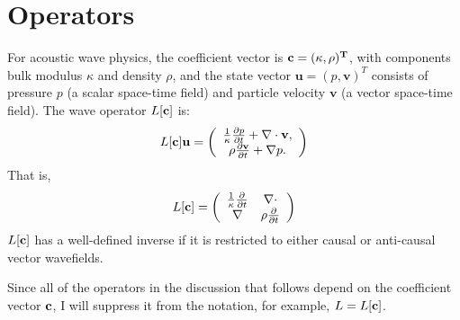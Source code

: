 \documentclass[georeport,12pt]{geophysics}
\newcommand{\bv}{\mathbf{v}}
\newcommand{\bu}{\mathbf{u}}
\begin{document}




\section{Operators}

For acoustic wave physics, the coefficient vector is
$\bf{c}=(\kappa,\rho)^T$, with components bulk modulus $\kappa$ and
density $\rho$, and the state vector $\bu=(p,\bv)^T$ consists of
pressure $p$ (a scalar space-time field) and particle velocity $\bv$
(a vector space-time field). The wave operator $L[\bf{c}]$ is:
\begin{equation}
\label{eqn:aweop}
L[\bf{c}]\bf{u} = 
\left(
\begin{array}{c}
\frac{1}{\kappa}\frac{\partial p}{\partial t}  + \nabla \cdot \bv, \\
\rho\frac{\partial \bv}{\partial t} + \nabla p.
\end{array}
\right) 
\end{equation}
That is,
\begin{equation}
  \label{eqn:awemat}
  L[{\bf c}] = \left(
    \begin{array}{cc}
      \frac{1}{\kappa}\frac{\partial}{\partial t} & \nabla \cdot \\
      \nabla & \rho \frac{\partial}{\partial t}
    \end{array}
  \right)
\end{equation}
$L[{\bf c}]$ has a well-defined inverse %
if it is restricted to either causal or anti-causal vector wavefields.

Since all of the operators in the discussion that follows depend on
the coefficient vector $\bf{c}$, I will suppress it from the notation,
for example, $L=L[\bf{c}]$.
\end{document}
